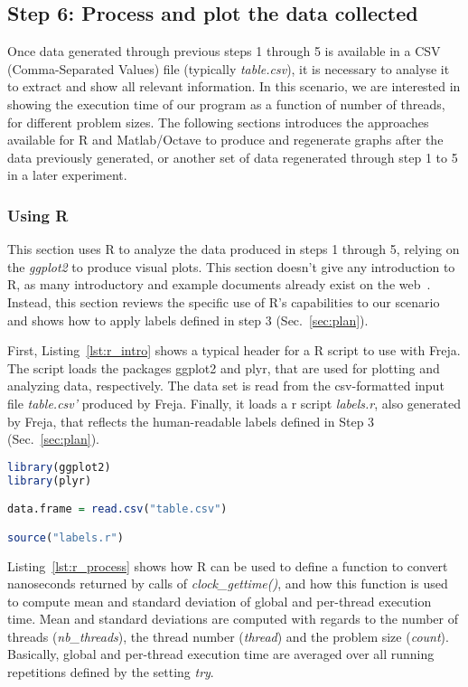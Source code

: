 \subsection{Step 6: Process and plot the data collected}
\label{sec:format}
Once data generated through previous steps 1 through 5 is available in a CSV (Comma-Separated Values) file (typically \emph{table.csv}), it is necessary to analyse it to extract and show all relevant information. In this scenario, we are interested in showing the execution time of our program as a function of number of threads, for different problem sizes. The following sections introduces the approaches available for R and Matlab/Octave to produce and regenerate graphs after the data previously generated, or another set of data regenerated through step 1 to 5 in a later experiment.

\subsubsection{Using R}
This section uses R to analyze the data produced in steps 1 through 5, relying on the \emph{ggplot2} to produce visual plots. This section doesn't give any introduction to R, as many introductory and example documents already exist on the web~\cite{r,rdebuts,ggplot2,ggplot2_examples}. Instead, this section reviews the specific use of R's capabilities to our scenario and shows how to apply labels defined in step 3 (Sec.~\ref{sec:plan}).

First, Listing~\ref{lst:r_intro} shows a typical header for a R script to use with Freja. The script loads the packages ggplot2 and plyr, that are used for plotting and analyzing data, respectively. The data set is read from the csv-formatted input file \emph{table.csv'} produced by Freja. Finally, it loads a r script \emph{labels.r}, also generated by Freja, that reflects the human-readable labels defined in Step 3 (Sec.~\ref{sec:plan}).
\begin{lstlisting}[caption={Introductory section of a R script to plot data produced by Freja.},label={lst:r_intro},language=r]
library(ggplot2)
library(plyr)

data.frame = read.csv("table.csv")

source("labels.r")
\end{lstlisting}

Listing~\ref{lst:r_process} shows how R can be used to define a function to convert nanoseconds returned by calls of \emph{clock\_gettime()}, and how this function is used to compute mean and standard deviation of global and per-thread execution time. Mean and standard deviations are computed with regards to the number of threads (\emph{nb\_threads}), the thread number (\emph{thread}) and the problem size (\emph{count}). Basically, global and per-thread execution time are averaged over all running repetitions defined by the setting \emph{try}.

